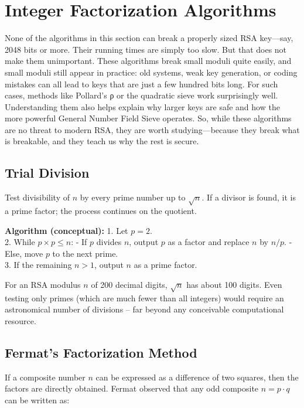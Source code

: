 \section{Integer Factorization Algorithms}

None of the algorithms in this section can break a properly sized RSA key—say, 2048 bits or more. Their running times are simply too slow. But that does not make them unimportant. These algorithms break small moduli quite easily, and small moduli still appear in practice: old systems, weak key generation, or coding mistakes can all lead to keys that are just a few hundred bits long. For such cases, methods like Pollard’s ρ or the quadratic sieve work surprisingly well. Understanding them also helps explain why larger keys are safe and how the more powerful General Number Field Sieve operates. So, while these algorithms are no threat to modern RSA, they are worth studying—because they break what is breakable, and they teach us why the rest is secure.

\subsection{Trial Division}

 Test divisibility of \(n\) by every prime number up to \(\sqrt{n}\). If a divisor is found, it is a prime factor; the process continues on the quotient.

\textbf{Algorithm (conceptual):}
1. Let \(p = 2\).
\\2. While \(p \times p \le n\):
   - If \(p\) divides \(n\), output \(p\) as a factor and replace \(n\) by \(n/p\).
   - Else, move \(p\) to the next prime.
\\3. If the remaining \(n > 1\), output \(n\) as a prime factor.

For an RSA modulus \(n\) of 200 decimal digits, \(\sqrt{n}\) has about 100 digits. Even testing only primes (which are much fewer than all integers) would require an astronomical number of divisions – far beyond any conceivable computational resource.

\subsection{Fermat’s Factorization Method}

If a composite number \(n\) can be expressed as a difference of two squares, then the factors are directly obtained. Fermat observed that any odd composite \(n = p \cdot q\) can be written as:

